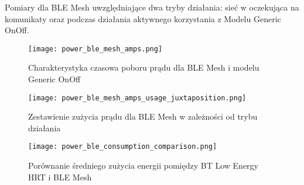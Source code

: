 Pomiary dla BLE Mesh uwzględniające dwa tryby działania: sieć w oczekująca na komunikaty oraz podczas działania aktywnego korzystania z Modelu Generic OnOff.

\begin{figure}[!htb]
	\centering \texttt{[image: power\_ble\_mesh\_amps.png]} 
	\caption{Charakterystyka czasowa poboru prądu dla BLE Mesh i modelu Generic OnOff}
	\label{rys:power_ble_mesh_amps}
\end{figure}

\lipsum[1-3]
\begin{figure}[!htb]
	\centering \texttt{[image: power\_ble\_mesh\_amps\_usage\_juxtaposition.png]} 
	\caption{Zestawienie zużycia prądu dla BLE Mesh w zależności od trybu działania}
	\label{rys:power_ble_mesh_amps_usage_juxtaposition}
\end{figure}

\lipsum[1-3]
\begin{figure}[!htb]
	\centering \texttt{[image: power\_ble\_consumption\_comparison.png]} 
	\caption{Porównanie średniego zużycia energii pomiędzy BT Low Energy HRT i BLE Mesh}
	\label{rys:power_ble_consumption_comparison}
\end{figure}




